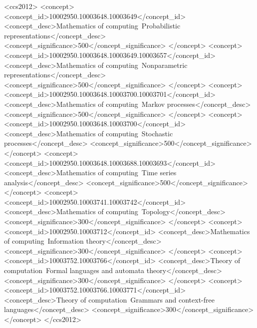 \documentclass[sigconf, anonymous, review]{acmart}
\begin{document}
\begin{CCSXML}
  <ccs2012>
  <concept>
  <concept_id>10002950.10003648.10003649</concept_id>
  <concept_desc>Mathematics of computing~Probabilistic representations</concept_desc>
  <concept_significance>500</concept_significance>
  </concept>
  <concept>
  <concept_id>10002950.10003648.10003649.10003657</concept_id>
  <concept_desc>Mathematics of computing~Nonparametric representations</concept_desc>
  <concept_significance>500</concept_significance>
  </concept>
  <concept>
  <concept_id>10002950.10003648.10003700.10003701</concept_id>
  <concept_desc>Mathematics of computing~Markov processes</concept_desc>
  <concept_significance>500</concept_significance>
  </concept>
  <concept>
  <concept_id>10002950.10003648.10003700</concept_id>
  <concept_desc>Mathematics of computing~Stochastic processes</concept_desc>
  <concept_significance>500</concept_significance>
  </concept>
  <concept>
  <concept_id>10002950.10003648.10003688.10003693</concept_id>
  <concept_desc>Mathematics of computing~Time series analysis</concept_desc>
  <concept_significance>500</concept_significance>
  </concept>
  <concept>
  <concept_id>10002950.10003741.10003742</concept_id>
  <concept_desc>Mathematics of computing~Topology</concept_desc>
  <concept_significance>300</concept_significance>
  </concept>
  <concept>
  <concept_id>10002950.10003712</concept_id>
  <concept_desc>Mathematics of computing~Information theory</concept_desc>
  <concept_significance>300</concept_significance>
  </concept>
  <concept>
  <concept_id>10003752.10003766</concept_id>
  <concept_desc>Theory of computation~Formal languages and automata theory</concept_desc>
  <concept_significance>300</concept_significance>
  </concept>
  <concept>
  <concept_id>10003752.10003766.10003771</concept_id>
  <concept_desc>Theory of computation~Grammars and context-free languages</concept_desc>
  <concept_significance>300</concept_significance>
  </concept>
  </ccs2012>
\end{CCSXML}

    
\end{document}

